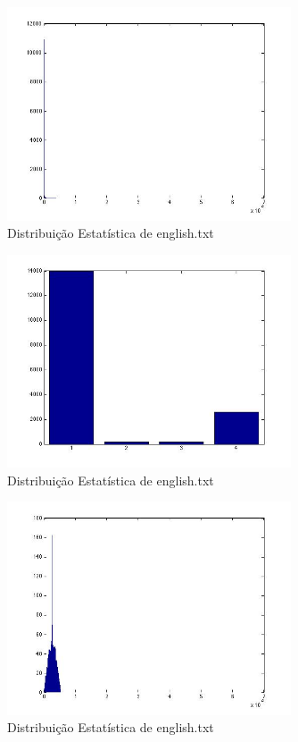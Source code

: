 \documentclass[12pt]{article}
\begin{document}
  \begin{figure}[H]
    \centering
      \includegraphics[width=0.75\textwidth]{ex5homer}
    \caption{Distribuição Estatística de english.txt}
  \end{figure}

  \begin{figure}[H]
    \centering
      \includegraphics[width=0.75\textwidth]{ex5homerbin}
    \caption{Distribuição Estatística de english.txt}
  \end{figure}

  \begin{figure}[H]
    \centering
      \includegraphics[width=0.75\textwidth]{ex5guitarsolo}
    \caption{Distribuição Estatística de english.txt}
  \end{figure}
\end{document}
